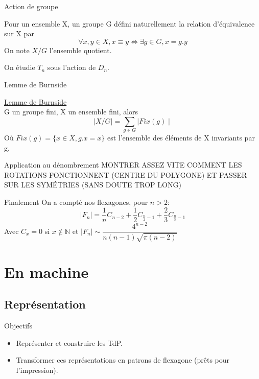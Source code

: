 \documentclass[french,xcolor=dvipsnames]{beamer}
\begin{document}
		\begin{frame}{Action de groupe}
			\begin{definition}
			Pour un ensemble X, un groupe G défini naturellement la relation d'équivalence sur X par
			\[
				\forall x,y \in X, x \equiv y \Leftrightarrow \exists g \in G, x=g.y
			\]
			On note $X/G$ l'ensemble quotient.
			\end{definition}
			
			On étudie $T_{n}$ sous l'action de $D_{n}$.
		\end{frame}
		
		\begin{frame}{Lemme de Burnside}
			\begin{theorem}{\underline{Lemme de Burnside}\\}
				G un groupe fini, X un ensemble fini, alors
				\[
				\mid X/G \mid = \sum_{g\in G}{\mid Fix(g) \mid}
				\]
				Où $Fix(g) = \{x\in X, g.x = x\}$ est l'ensemble des éléments de X invariants par g.
			\end{theorem}
		\end{frame}
		
		\begin{frame}{Application au dénombrement}
			MONTRER ASSEZ VITE COMMENT LES ROTATIONS FONCTIONNENT (CENTRE DU POLYGONE) ET PASSER SUR LES SYMÉTRIES (SANS DOUTE TROP LONG)
		\end{frame}
		
		\begin{frame}{Finalement}
		On a compté nos flexagones, pour $n>2$:
		{\large
		\[
			\mid F_{n} \mid = \frac{1}{n}C_{n-2} + \frac{1}{2}C_{\frac{n}{2}-1} + \frac{2}{3}C_{\frac{n}{3}-1}
		\]
		}
		Avec $C_{x} = 0$ si $x \not\in \mathbb{N}$
		et $\mid F_{n} \mid \sim \dfrac{4^{n-2}}{n(n-1)\sqrt{\pi(n-2)}}$
	\end{frame}		
		
		
	\section{En machine}
		\subsection{Représentation}
		
		\begin{frame}{Objectifs}
			\begin{itemize}
					\item Représenter et construire les TdP.
					\item Transformer ces représentations en patrons de flexagone (prêts pour l'impression).
			\end{itemize}		
		\end{frame}
		
\end{document}
